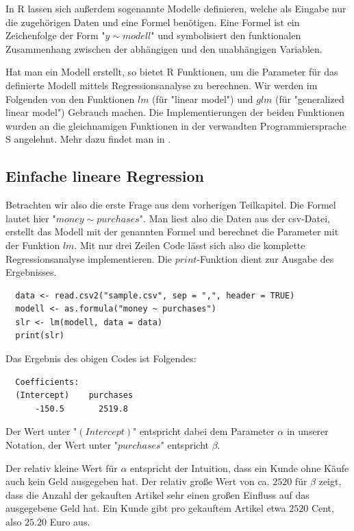 In R lassen sich außerdem sogenannte Modelle definieren, welche als Eingabe nur die zugehörigen Daten und eine Formel benötigen. Eine Formel ist ein Zeichenfolge der Form "$y \sim modell$" und symbolisiert den funktionalen Zusammenhang zwischen der abhängigen und den unabhängigen Variablen.

Hat man ein Modell erstellt, so bietet R Funktionen, um die Parameter für das definierte Modell mittels Regressionsanalyse zu berechnen. Wir werden im Folgenden von den Funktionen $lm$ (für "linear model") und $glm$ (für "generalized linear model") Gebrauch machen. Die Implementierungen der beiden Funktionen wurden an die gleichnamigen Funktionen in der verwandten Programmiersprache S angelehnt. Mehr dazu findet man in \cite{statistical}.

\subsection{Einfache lineare Regression}
\label{subsection:3:2:2}

Betrachten wir also die erste Frage aus dem vorherigen Teilkapitel. Die Formel lautet hier "$money \sim purchases$". Man liest also die Daten aus der csv-Datei, erstellt das Modell mit der genannten Formel und berechnet die Parameter mit der Funktion $lm$. Mit nur drei Zeilen Code lässt sich also die komplette Regressionsanalyse implementieren. Die $print$-Funktion dient zur Ausgabe des Ergebnisses.

\begin{verbatim}
  data <- read.csv2("sample.csv", sep = ",", header = TRUE)
  modell <- as.formula("money ~ purchases")
  slr <- lm(modell, data = data)
  print(slr)
\end{verbatim}

Das Ergebnis des obigen Codes ist Folgendes:

\begin{verbatim}
  Coefficients:
  (Intercept)    purchases
      -150.5       2519.8
\end{verbatim}

Der Wert unter "$(Intercept)$" entspricht dabei dem Parameter $\alpha$ in unserer Notation, der Wert unter "$purchases$" entspricht $\beta$.

Der relativ kleine Wert für $\alpha$ entspricht der Intuition, dass ein Kunde ohne Käufe auch kein Geld ausgegeben hat. Der relativ große Wert von ca. $2520$ für $\beta$ zeigt, dass die Anzahl der gekauften Artikel sehr einen großen Einfluss auf das ausgegebene Geld hat. Ein Kunde gibt pro gekauftem Artikel etwa $2520$ Cent, also $25.20$ Euro aus.

